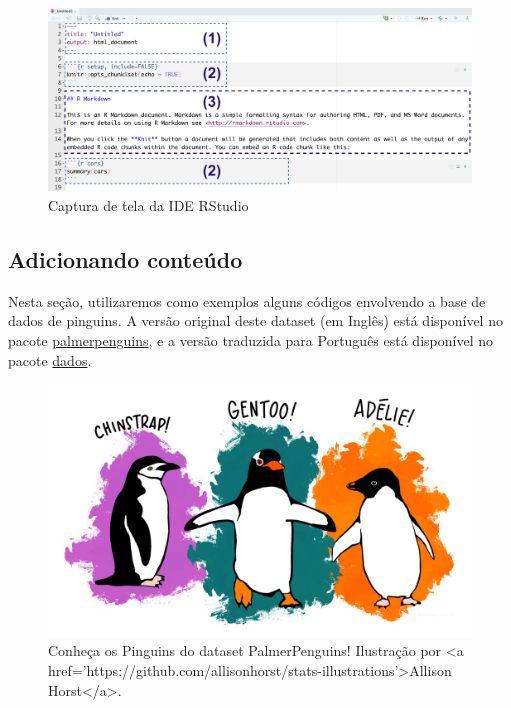 \documentclass[
]{book}
\begin{document}
\begin{figure}

{\centering \includegraphics[width=39.94in]{assets/img/relatorios/rmarkdown} 

}

\caption{Captura de tela da IDE RStudio}\label{fig:unnamed-chunk-3}
\end{figure}

\hypertarget{adicionando-conteuxfado}{%
\subsection{Adicionando conteúdo}\label{adicionando-conteuxfado}}

Nesta seção, utilizaremos como exemplos alguns códigos envolvendo a base de dados de pinguins. A versão original deste dataset (em Inglês) está disponível no pacote \href{https://github.com/allisonhorst/palmerpenguins}{palmerpenguins}, e a versão traduzida para Português está disponível no pacote \href{https://cienciadedatos.github.io/dados/}{dados}.

\begin{figure}

{\centering \includegraphics[width=0.8\linewidth]{assets/img/relatorios/lter_penguins} 

}

\caption{Conheça os Pinguins do dataset PalmerPenguins! Ilustração por <a href='https://github.com/allisonhorst/stats-illustrations'>Allison Horst</a>.}\label{fig:unnamed-chunk-4}
\end{figure}
\end{document}
